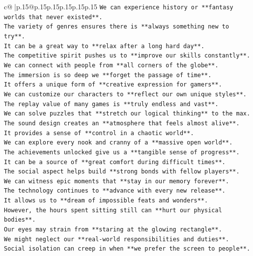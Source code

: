 \documentclass{article}
\begin{document}
{\begin{supertabular}{c@{$\;$}|p{.15\linewidth}@{}p{.15\linewidth}p{.15\linewidth}p{.15\linewidth}p{.15\linewidth}p{.15\linewidth}}
{{{\texttt{We can experience history or **fantasy worlds that never existed**.} \\
\texttt{The variety of genres ensures there is **always something new to try**.} \\
\texttt{It can be a great way to **relax after a long hard day**.} \\
\texttt{The competitive spirit pushes us to **improve our skills constantly**.} \\
\texttt{We can connect with people from **all corners of the globe**.} \\
\texttt{The immersion is so deep we **forget the passage of time**.} \\
\texttt{It offers a unique form of **creative expression for gamers**.} \\
\texttt{We can customize our characters to **reflect our own unique styles**.} \\
\texttt{The replay value of many games is **truly endless and vast**.} \\
\texttt{We can solve puzzles that **stretch our logical thinking** to the max.} \\
\texttt{The sound design creates an **atmosphere that feels almost alive**.} \\
\texttt{It provides a sense of **control in a chaotic world**.} \\
\texttt{We can explore every nook and cranny of a **massive open world**.} \\
\texttt{The achievements unlocked give us a **tangible sense of progress**.} \\
\texttt{It can be a source of **great comfort during difficult times**.} \\
\texttt{The social aspect helps build **strong bonds with fellow players**.} \\
\texttt{We can witness epic moments that **stay in our memory forever**.} \\
\texttt{The technology continues to **advance with every new release**.} \\
\texttt{It allows us to **dream of impossible feats and wonders**.} \\
\texttt{However, the hours spent sitting still can **hurt our physical bodies**.} \\
\texttt{Our eyes may strain from **staring at the glowing rectangle**.} \\
\texttt{We might neglect our **real{-}world responsibilities and duties**.} \\
\texttt{Social isolation can creep in when **we prefer the screen to people**.} \\
}}}
\end{supertabular}}
\end{document}
